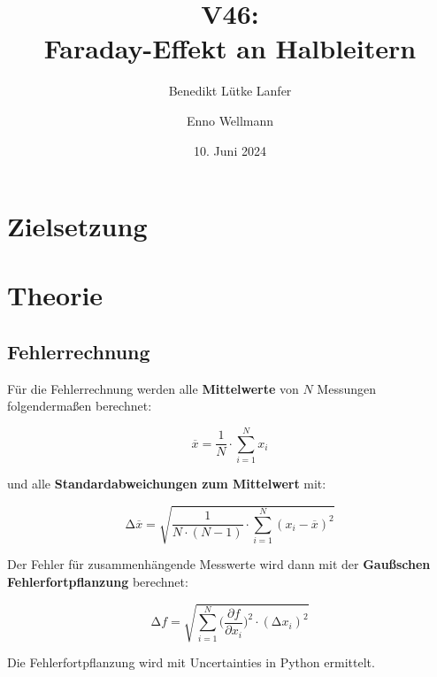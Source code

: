 

\title{V46:\\ Faraday-Effekt an Halbleitern}
\author{Benedikt Lütke Lanfer \and Enno Wellmann}
\date{10. Juni 2024}
\publishers{TU Dortmund – Fakultät Physik}



\tableofcontents
\newpage

\section{Zielsetzung}


\section{Theorie}

\subsection{Fehlerrechnung}
Für die Fehlerrechnung werden alle \textbf{Mittelwerte} von $N$ Messungen folgendermaßen berechnet:

\begin{equation}
    \overline{x} = \frac{1}{N} \cdot \sum_{i=1}^N x_i
    \label{eqn:Mittelwert}
\end{equation}

und alle \textbf{Standardabweichungen zum Mittelwert} mit:

\begin{equation}
    \increment\overline{x} = \sqrt{\frac{1}{N\cdot(N-1)}\cdot\sum_{i=1}^N (x_i-\overline{x})^2}
    \label{eqn:St_Mittelwert}
\end{equation}

Der Fehler für zusammenhängende Messwerte wird dann mit der \textbf{Gaußschen Fehlerfortpflanzung} berechnet:

\begin{equation}
    \increment{f} = \sqrt{ \sum_{i = 1}^{N}  \biggl(\frac{\partial{f}}{\partial{x_i}}\biggr)^2\cdot(\increment{x_i})^2}
    \label{eqn:Gauss}
\end{equation}

Die Fehlerfortpflanzung wird mit Uncertainties in Python \cite{uncertainties} ermittelt.


